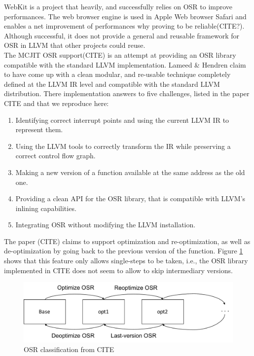 WebKit is a project that heavily, and successfully relies on OSR to improve performances.
The web browser engine is used in Apple Web browser Safari and enables a net improvement of performances why proving to be reliable(CITE?).
Although successful, it does not provide a general and reusable framework for OSR in LLVM that other projects could reuse.\\

The MCJIT OSR support(CITE) is an attempt at providing an OSR library compatible with the standard LLVM implementation.
Lameed \& Hendren claim to have come up with a clean modular, and re-usable technique completely defined at the LLVM IR level and compatible with the standard LLVM distribution.
There implementation answers to five challenges, listed in the paper CITE and that we reproduce here:\\ 

\begin{enumerate}
    \item Identifying correct interrupt points and using the current LLVM IR to represent them.
    \item Using the LLVM tools to correctly transform the IR while preserving a correct control flow graph. 
    \item Making a new version of a function available at the same address as the old one.
    \item Providing a clean API for the OSR library, that is compatible with LLVM's inlining capabilities.
    \item Integrating OSR without modifying the LLVM installation.
\end{enumerate}

The paper (CITE) claims to support optimization and re-optimization, as well as de-optimization by going back to the previous version of the function.
Figure \ref{OSR classification} shows that this feature only allows single-steps to be taken, i.e., the OSR library implemented in CITE does not seem to allow to skip intermediary versions.\\

\begin{figure}[h]
\centering
\includegraphics[scale=0.5]{Figures/OSRClassification}
\decoRule
\caption[OSR classification]{OSR classification from CITE}
\label{OSR classification}
\end{figure}

